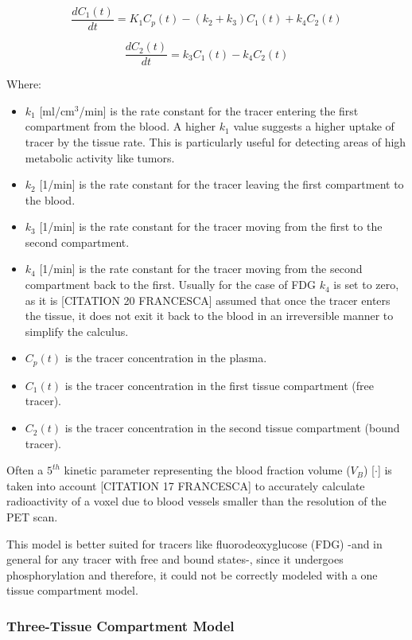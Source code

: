 \begin{equation}
\frac{dC_1(t)}{dt} = K_1 C_p(t) - (k_2 + k_3) C_1(t) + k_4 C_2(t)
\end{equation}

\begin{equation}
\frac{dC_2(t)}{dt} = k_3 C_1(t) - k_4 C_2(t)
\end{equation}

Where:
\begin{itemize}
    \item $k_1$ [ml/cm$^3$/min] is the rate constant for the tracer entering the first compartment from the blood. A higher $k_1$ value suggests a higher uptake of tracer by the tissue rate. This is particularly useful for detecting areas of high metabolic activity like tumors.
    \item $k_2$ [1/min] is the rate constant for the tracer leaving the first compartment to the blood.
    \item $k_3$ [1/min] is the rate constant for the tracer moving from the first to the second compartment.
    \item $k_4$ [1/min] is the rate constant for the tracer moving from the second compartment back to the first. Usually for the case of FDG $k_4$ is set to zero, as it is [CITATION 20 FRANCESCA] assumed that once the tracer enters the tissue, it does not exit it back to the blood in an irreversible manner to simplify the calculus.
    \item $C_p(t)$ is the tracer concentration in the plasma.
    \item $C_1(t)$ is the tracer concentration in the first tissue compartment (free tracer).
    \item $C_2(t)$ is the tracer concentration in the second tissue compartment (bound tracer).
\end{itemize}


Often a $5^{th}$ kinetic parameter representing the blood fraction volume ($V_B$) [$\cdot$] is taken into account [CITATION 17 FRANCESCA] to accurately calculate radioactivity of a voxel due to blood vessels smaller than the resolution of the PET scan.

This model is better suited for tracers like fluorodeoxyglucose (FDG) -and in general for any tracer with free and bound states-, since it undergoes phosphorylation and therefore, it could not be correctly modeled with a one tissue compartment model.

\subsubsection{Three-Tissue Compartment Model}

